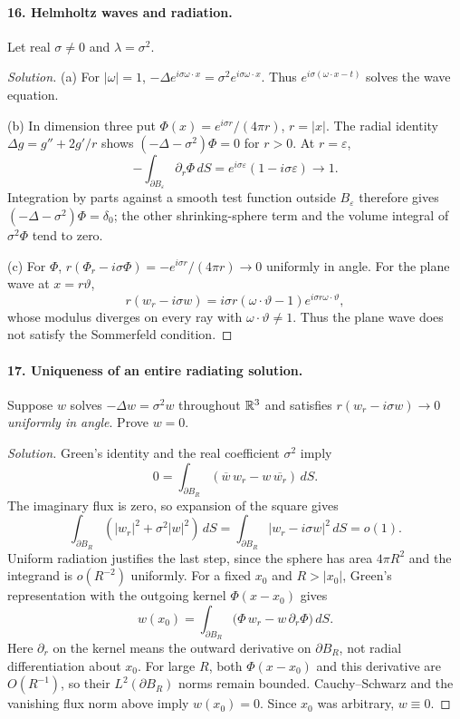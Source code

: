 \paragraph{16. Helmholtz waves and radiation.}
Let real $\sigma\ne0$ and $\lambda=\sigma^2$.
\begin{proof}[Solution]
(a) For $|\omega|=1$,
$-\Delta e^{i\sigma\omega\cdot x}=\sigma^2e^{i\sigma\omega\cdot x}$.
Thus $e^{i\sigma(\omega\cdot x-t)}$ solves the wave equation.

(b) In dimension three put
$\Phi(x)=e^{i\sigma r}/(4\pi r)$, $r=|x|$.
The radial identity $\Delta g=g''+2g'/r$ shows
$(-\Delta-\sigma^2)\Phi=0$ for $r>0$.
At $r=\varepsilon$,
\[
 -\int_{\partial B_\varepsilon}\partial_r\Phi\,dS
 =e^{i\sigma\varepsilon}(1-i\sigma\varepsilon)\longrightarrow1.
\]
Integration by parts against a smooth test function outside
$B_\varepsilon$ therefore gives
$(-\Delta-\sigma^2)\Phi=\delta_0$; the other shrinking-sphere term and
the volume integral of $\sigma^2\Phi$ tend to zero.

(c) For $\Phi$,
$r(\Phi_r-i\sigma\Phi)=-e^{i\sigma r}/(4\pi r)\to0$ uniformly in angle.
For the plane wave at $x=r\vartheta$,
\[
 r(w_r-i\sigma w)
 =i\sigma r(\omega\cdot\vartheta-1)e^{i\sigma r\omega\cdot\vartheta},
\]
whose modulus diverges on every ray with $\omega\cdot\vartheta\ne1$.
Thus the plane wave does not satisfy the Sommerfeld condition.
\end{proof}

\Needspace{30mm}
\paragraph{17. Uniqueness of an entire radiating solution.}
Suppose $w$ solves $-\Delta w=\sigma^2w$ throughout $\mathbb{R}^3$ and satisfies
$r(w_r-i\sigma w)\to0$ \emph{uniformly in angle}. Prove $w=0$.
\begin{proof}[Solution]
Green's identity and the real coefficient $\sigma^2$ imply
\[
 0=\int_{\partial B_R}(\overline w\,w_r-w\,\overline{w_r})\,dS.
\]
The imaginary flux is zero, so expansion of the square gives
\[
 \int_{\partial B_R}(|w_r|^2+\sigma^2|w|^2)\,dS
 =\int_{\partial B_R}|w_r-i\sigma w|^2\,dS=o(1).
\]
Uniform radiation justifies the last step, since the sphere has area
$4\pi R^2$ and the integrand is $o(R^{-2})$ uniformly.
For a fixed $x_0$ and $R>|x_0|$, Green's representation with the
outgoing kernel $\Phi(x-x_0)$ gives
\[
 w(x_0)=\int_{\partial B_R}
   \bigl(\Phi\,w_r-w\,\partial_r\Phi\bigr)\,dS .
\]
Here $\partial_r$ on the kernel means the outward derivative on
$\partial B_R$, not radial differentiation about $x_0$.
For large $R$, both $\Phi(x-x_0)$ and this derivative are $O(R^{-1})$,
so their $L^2(\partial B_R)$ norms remain bounded.
Cauchy--Schwarz and the vanishing flux norm above imply $w(x_0)=0$.
Since $x_0$ was arbitrary, $w\equiv0$.
\end{proof}
\Needspace{45mm}

